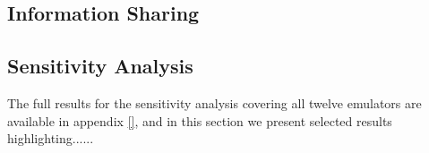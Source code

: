 \subsection{Information Sharing}
\label{sub:sharing_results}



\subsection{Sensitivity Analysis}
\label{sub:sa_results}

The full results for the sensitivity analysis covering all twelve emulators are available in appendix \ref{}, and in this section we present selected results highlighting......

